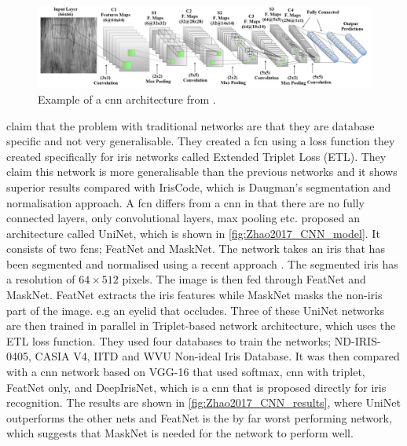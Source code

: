 \begin{figure}[H]
\centering
\includegraphics[width=\textwidth]{figures/Al_Waisy2017_CNN_model} 
\caption{Example of a \gls{cnn} architecture  from \cite{Al-Waisy2017}.}
\label{fig:Al_Waisy2017_CNN_model}
\end{figure}


\cite{Zhao2017a} claim that the problem with traditional networks are that they are database specific and not very generalisable. They created a \gls{fcn} using a loss function they created specifically for iris networks called Extended Triplet Loss (ETL). They claim this network is more generalisable than the previous networks and it shows superior results compared with IrisCode, which is Daugman's segmentation and normalisation approach. A \gls{fcn} differs from a \gls{cnn} in that there are no fully connected layers, only convolutional layers, max pooling etc. \cite{Zhao2017a} proposed an architecture called UniNet, which is shown in \autoref{fig:Zhao2017_CNN_model}. It consists of two \gls{fcn}s; FeatNet and MaskNet. The network takes an iris that has been segmented and normalised using a recent approach \citep{Zhao2015a}. The segmented iris has a resolution of $64\times512$ pixels. The image is then fed through FeatNet and MaskNet. FeatNet extracts the iris features while MaskNet masks the non-iris part of the image. e.g an eyelid that occludes. Three of these UniNet networks are then trained in parallel in Triplet-based network architecture, which uses the ETL loss function. They used four databases to train the networks; ND-IRIS-0405, CASIA V4, IITD and WVU Non-ideal Iris Database. It was then compared with a \gls{cnn} network based on VGG-16 that used softmax, \gls{cnn} with triplet, FeatNet only, and DeepIrisNet, which is a \gls{cnn} that is proposed directly for iris recognition. The results are shown in \autoref{fig:Zhao2017_CNN_results}, where UniNet outperforms the other nets and FeatNet is the by far worst performing network, which suggests that MaskNet is needed for the network to perform well. 

